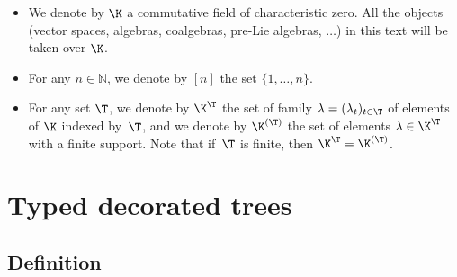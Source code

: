 \begin{Notation}\qquad
\begin{itemize}\itemsep=0pt
\item We denote by $\K$ a commutative field of characteristic zero. All the objects (vector spaces, algebras,
 coalgebras, pre-Lie algebras, $\dots$)
in this text will be taken over $\K$.
\item For any $n\in \mathbb{N}$, we denote by $[n]$ the set $\{1,\dots,n\}$.
\item For any set $\T$, we denote by $\K^\T$ the set of family $\lambda=(\lambda_t)_{t\in \T}$ of elements of $\K$
indexed by~$\T$, and we denote by $\K^{(\T)}$ the set of elements $\lambda\in \K^\T$ with a finite support.
Note that if~$\T$ is finite, then $\K^\T=\K^{(\T)}$.
\end{itemize}
\end{Notation}

\section{Typed decorated trees}

\subsection{Definition}

